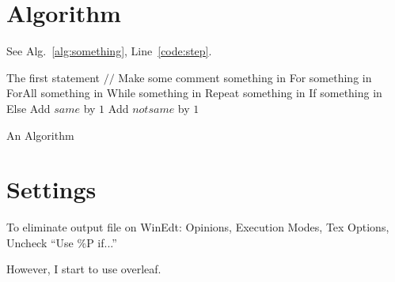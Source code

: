 \documentclass[a4paper]{article}
\begin{document}
\section{Algorithm}
See Alg.~\ref{alg:something}, Line~\ref{code:step}.

 \begin{algorithm}[!ht] %
  The first statement\;
  \label{code:step}
  $//$ Make some comment\;
  {something in For\;}  
  {something in ForAll\;}
  {something in While\;}
  {something in Repeat\;}
  {something in If\;}
  {something in Else\;}
  {Add $same$ by $1$\;}
  {Add $notsame$ by $1$\;}
  \caption{An Algorithm}
  \label{alg:something}
 \end{algorithm}

\section{Settings}
To eliminate output file on WinEdt:
Opinions, Execution Modes, Tex Options, Uncheck ``Use \%P if...''

\noindent However, I start to use overleaf. 


%
\end{document}
